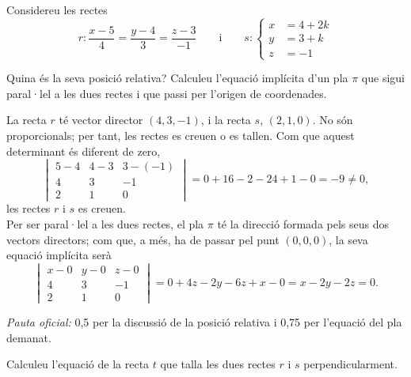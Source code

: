 Considereu les rectes
\[
r\colon\frac{x-5}{4}=\frac{y-4}{3}=\frac{z-3}{-1}\qquad\text{i}\qquad
s\colon\left\{\begin{aligned}x&=4+2k\\y&=3+k\\z&=-1\end{aligned}\right.
\]

\begin{apartats}

Quina és la seva posició relativa? Calculeu l'equació implícita d'un pla $\pi$ que sigui paral·lel a les dues
rectes i que passi per l'origen de coordenades.

\begin{solucio}
La recta $r$ té vector director $(4,3,-1)$, i la recta $s$, $(2,1,0)$. No són proporcionals; per tant, les rectes
es creuen o es tallen. Com que aquest determinant és diferent de zero,
\[
\begin{vmatrix}5-4&4-3&3-(-1)\\4&3&-1\\2&1&0\end{vmatrix}=0+16-2-24+1-0=-9\neq0,
\]
les rectes $r$ i $s$ es creuen.\\
Per ser paral·lel a les dues rectes, el pla $\pi$ té la direcció formada pels seus dos vectors directors; com
que, a més, ha de passar pel punt $(0,0,0)$, la seva equació implícita serà
\[
\begin{vmatrix}x-0&y-0&z-0\\4&3&-1\\2&1&0\end{vmatrix}=0+4z-2y-6z+x-0=x-2y-2z=0 .
\]

\textit{Pauta oficial:} 0,5 per la discussió de la posició relativa i 0,75 per l'equació del pla demanat.
\end{solucio}

Calculeu l'equació de la recta $t$ que talla les dues rectes $r$ i $s$ perpendicularment.


\end{apartats}
